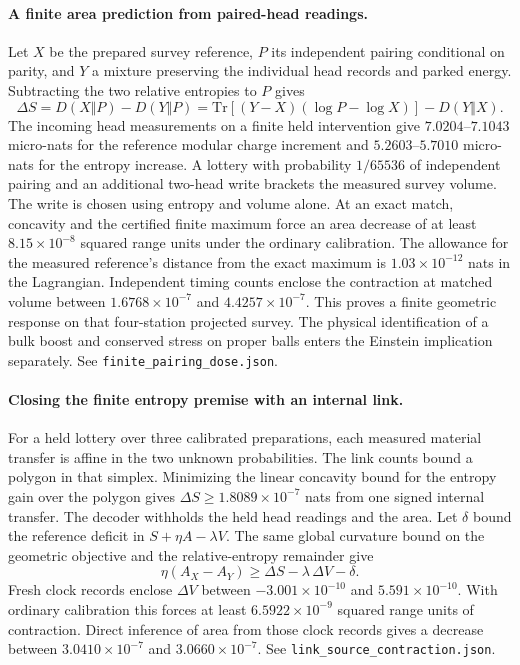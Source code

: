 \documentclass[11pt]{article}
\begin{document}
\paragraph{A finite area prediction from paired-head readings.}
Let \(X\) be the prepared survey reference, \(P\) its independent
pairing conditional on parity, and \(Y\) a mixture preserving the
individual head records and parked energy. Subtracting the two
relative entropies to \(P\) gives
\[
 \Delta S=D(X\Vert P)-D(Y\Vert P)
 =\mathrm{Tr}[(Y-X)(\log P-\log X)]-D(Y\Vert X).
\]
The incoming head measurements on a finite held intervention give
\(7.0204\)--\(7.1043\) micro-nats for the reference modular charge
increment and \(5.2603\)--\(5.7010\) micro-nats for the entropy
increase. A lottery with probability \(1/65536\) of independent pairing
and an additional two-head write brackets the measured survey volume.
The write is chosen using entropy and volume alone. At an exact match,
concavity and the certified finite maximum force an area decrease of
at least \(8.15\times10^{-8}\) squared range units under the ordinary
calibration. The allowance for the measured reference's distance from
the exact maximum is \(1.03\times10^{-12}\) nats in the Lagrangian.
Independent timing counts enclose the contraction at matched volume
between \(1.6768\times10^{-7}\) and \(4.4257\times10^{-7}\). This
proves a finite geometric response on that four-station projected
survey. The physical identification of a bulk boost and conserved
stress on proper balls enters the Einstein implication separately.
See \texttt{finite\_pairing\_dose.json}.

\paragraph{Closing the finite entropy premise with an internal link.}
For a held lottery over three calibrated preparations, each measured
material transfer is affine in the two unknown probabilities. The
link counts bound a polygon in that simplex. Minimizing the linear
concavity bound for the entropy gain over the polygon gives
\(\Delta S\ge1.8089\times10^{-7}\) nats from one signed internal
transfer. The decoder withholds the held head readings and the area.
Let \(\delta\) bound the reference deficit in \(S+\eta A-\lambda V\).
The same global curvature bound on the geometric objective and the
relative-entropy remainder give
\[
 \eta(A_X-A_Y)\ge\Delta S-\lambda\,\Delta V-\delta .
\]
Fresh clock records enclose \(\Delta V\) between
\(-3.001\times10^{-10}\) and \(5.591\times10^{-10}\). With
ordinary calibration this forces at least \(6.5922\times10^{-9}\)
squared range units of contraction. Direct inference of area from
those clock records gives a decrease between \(3.0410\times10^{-7}\)
and \(3.0660\times10^{-7}\). See
\texttt{link\_source\_contraction.json}.
\end{document}
